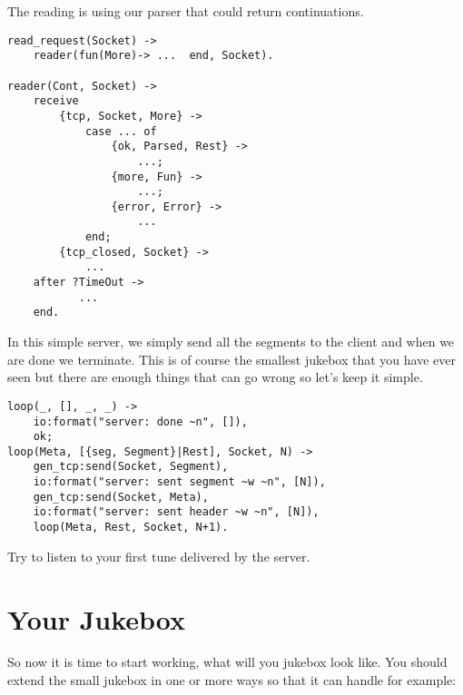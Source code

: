 \documentclass[a4paper,dvips,11pt]{article}
\begin{document}
The reading is using our parser that could return continuations. 

\begin{verbatim}
read_request(Socket) ->
    reader(fun(More)-> ...  end, Socket).
            
reader(Cont, Socket) ->
    receive
        {tcp, Socket, More} ->
            case ... of 
                {ok, Parsed, Rest} ->
                    ...;
                {more, Fun} ->
                    ...;
                {error, Error} ->
                    ...              
            end;
        {tcp_closed, Socket} ->
            ...
    after ?TimeOut ->
           ...
    end.
\end{verbatim}

In this simple server, we simply send all the segments to the client
and when we are done we terminate. This is of course the smallest
jukebox that you have ever seen but there are enough things that can go
wrong so let's keep it simple.

\begin{verbatim}
loop(_, [], _, _) ->
    io:format("server: done ~n", []),
    ok;
loop(Meta, [{seg, Segment}|Rest], Socket, N) ->
    gen_tcp:send(Socket, Segment),
    io:format("server: sent segment ~w ~n", [N]),
    gen_tcp:send(Socket, Meta),           
    io:format("server: sent header ~w ~n", [N]),
    loop(Meta, Rest, Socket, N+1).
\end{verbatim}
 
Try to listen to your first tune delivered by the server.

\section{Your Jukebox}

So now it is time to start working, what will you jukebox look
like. You should extend the small jukebox in one or more ways so that
it can handle for example:
\end{document}
